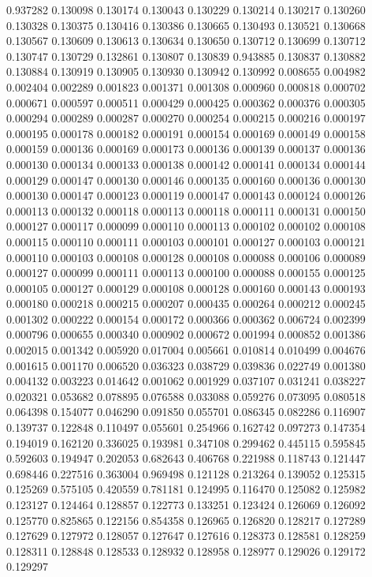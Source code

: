 0.937282
0.130098
0.130174
0.130043
0.130229
0.130214
0.130217
0.130260
0.130328
0.130375
0.130416
0.130386
0.130665
0.130493
0.130521
0.130668
0.130567
0.130609
0.130613
0.130634
0.130650
0.130712
0.130699
0.130712
0.130747
0.130729
0.132861
0.130807
0.130839
0.943885
0.130837
0.130882
0.130884
0.130919
0.130905
0.130930
0.130942
0.130992
0.008655
0.004982
0.002404
0.002289
0.001823
0.001371
0.001308
0.000960
0.000818
0.000702
0.000671
0.000597
0.000511
0.000429
0.000425
0.000362
0.000376
0.000305
0.000294
0.000289
0.000287
0.000270
0.000254
0.000215
0.000216
0.000197
0.000195
0.000178
0.000182
0.000191
0.000154
0.000169
0.000149
0.000158
0.000159
0.000136
0.000169
0.000173
0.000136
0.000139
0.000137
0.000136
0.000130
0.000134
0.000133
0.000138
0.000142
0.000141
0.000134
0.000144
0.000129
0.000147
0.000130
0.000146
0.000135
0.000160
0.000136
0.000130
0.000130
0.000147
0.000123
0.000119
0.000147
0.000143
0.000124
0.000126
0.000113
0.000132
0.000118
0.000113
0.000118
0.000111
0.000131
0.000150
0.000127
0.000117
0.000099
0.000110
0.000113
0.000102
0.000102
0.000108
0.000115
0.000110
0.000111
0.000103
0.000101
0.000127
0.000103
0.000121
0.000110
0.000103
0.000108
0.000128
0.000108
0.000088
0.000106
0.000089
0.000127
0.000099
0.000111
0.000113
0.000100
0.000088
0.000155
0.000125
0.000105
0.000127
0.000129
0.000108
0.000128
0.000160
0.000143
0.000193
0.000180
0.000218
0.000215
0.000207
0.000435
0.000264
0.000212
0.000245
0.001302
0.000222
0.000154
0.000172
0.000366
0.000362
0.006724
0.002399
0.000796
0.000655
0.000340
0.000902
0.000672
0.001994
0.000852
0.001386
0.002015
0.001342
0.005920
0.017004
0.005661
0.010814
0.010499
0.004676
0.001615
0.001170
0.006520
0.036323
0.038729
0.039836
0.022749
0.001380
0.004132
0.003223
0.014642
0.001062
0.001929
0.037107
0.031241
0.038227
0.020321
0.053682
0.078895
0.076588
0.033088
0.059276
0.073095
0.080518
0.064398
0.154077
0.046290
0.091850
0.055701
0.086345
0.082286
0.116907
0.139737
0.122848
0.110497
0.055601
0.254966
0.162742
0.097273
0.147354
0.194019
0.162120
0.336025
0.193981
0.347108
0.299462
0.445115
0.595845
0.592603
0.194947
0.202053
0.682643
0.406768
0.221988
0.118743
0.121447
0.698446
0.227516
0.363004
0.969498
0.121128
0.213264
0.139052
0.125315
0.125269
0.575105
0.420559
0.781181
0.124995
0.116470
0.125082
0.125982
0.123127
0.124464
0.128857
0.122773
0.133251
0.123424
0.126069
0.126092
0.125770
0.825865
0.122156
0.854358
0.126965
0.126820
0.128217
0.127289
0.127629
0.127972
0.128057
0.127647
0.127616
0.128373
0.128581
0.128259
0.128311
0.128848
0.128533
0.128932
0.128958
0.128977
0.129026
0.129172
0.129297
